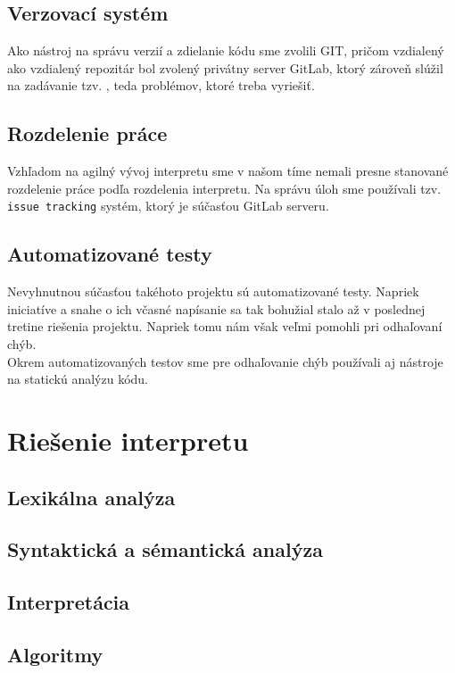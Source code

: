 \documentclass[12pt]{article}
\begin{document}
        \subsection{Verzovací systém}
			Ako nástroj na správu verzií a zdielanie kódu sme zvolili GIT, pričom vzdialený ako vzdialený repozitár bol zvolený privátny server GitLab, ktorý zároveň slúžil na zadávanie tzv. , teda problémov, ktoré treba vyriešiť.
		\subsection{Rozdelenie práce}
			Vzhľadom na agilný vývoj interpretu sme v našom tíme nemali presne stanované rozdelenie práce podľa rozdelenia interpretu. Na správu úloh sme používali tzv. \texttt{issue tracking} systém, ktorý je súčasťou GitLab serveru.
        \subsection{Automatizované testy}
	        Nevyhnutnou súčasťou takéhoto projektu sú automatizované testy. Napriek iniciatíve a snahe o ich včasné napísanie sa tak bohužial stalo až v poslednej tretine riešenia projektu. Napriek tomu nám však veľmi pomohli pri odhaľovaní chýb.\\
	        Okrem automatizovaných testov sme pre odhaľovanie chýb používali aj nástroje na statickú analýzu kódu.
	\section{Riešenie interpretu}
		\subsection{Lexikálna analýza}
		\subsection{Syntaktická a sémantická analýza}
		\subsection{Interpretácia}
		\subsection{Algoritmy}
\end{document}
